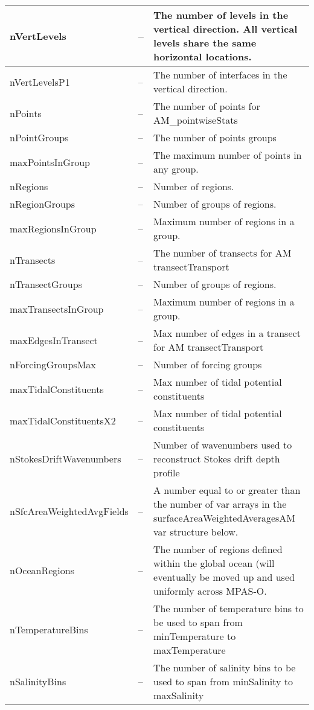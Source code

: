{\begin{center}
\begin{longtable}{| p{1.0in} || p{1.0in} | p{4.0in} |}
    \hline
    nVertLevels & -- & The number of levels in the vertical direction. All vertical levels share the same horizontal locations. \\
    \hline
    nVertLevelsP1 & -- & The number of interfaces in the vertical direction. \\
    \hline
    nPoints & -- & The number of points for AM\_pointwiseStats \\
    \hline
    nPointGroups & -- & The number of points groups \\
    \hline
    maxPointsInGroup & -- & The maximum number of points in any group. \\
    \hline
    nRegions & -- & Number of regions. \\
    \hline
    nRegionGroups & -- & Number of groups of regions. \\
    \hline
    maxRegionsInGroup & -- & Maximum number of regions in a group. \\
    \hline
    nTransects & -- & The number of transects for AM transectTransport \\
    \hline
    nTransectGroups & -- & Number of groups of regions. \\
    \hline
    maxTransectsInGroup & -- & Maximum number of regions in a group. \\
    \hline
    maxEdgesInTransect & -- & Max number of edges in a transect for AM transectTransport \\
    \hline
    nForcingGroupsMax & -- & Number of forcing groups \\
    \hline
    maxTidalConstituents & -- & Max number of tidal potential constituents \\
    \hline
    maxTidalConstituentsX2 & -- & Max number of tidal potential constituents \\
    \hline
    nStokesDriftWavenumbers & -- & Number of wavenumbers used to reconstruct Stokes drift depth profile \\
    \hline
    nSfcAreaWeightedAvgFields & -- & A number equal to or greater than the number of var arrays in the surfaceAreaWeightedAveragesAM var structure below. \\
    \hline
    nOceanRegions & -- & The number of regions defined within the global ocean (will eventually be moved up and used uniformly across MPAS-O. \\
    \hline
    nTemperatureBins & -- & The number of temperature bins to be used to span from minTemperature to maxTemperature \\
    \hline
    nSalinityBins & -- & The number of salinity bins to be used to span from minSalinity to maxSalinity \\

\end{longtable}
\end{center}}
